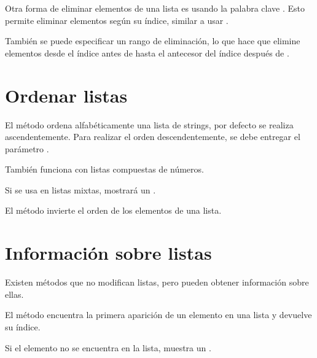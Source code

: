 Otra forma de eliminar elementos de una lista es usando la palabra clave .
Esto permite eliminar elementos según su índice, similar a usar .


También se puede especificar un rango de eliminación, lo que hace que elimine elementos desde el índice antes de \ttt{:} hasta el antecesor del índice después de \ttt{:}.


\section{Ordenar listas}

El método  ordena alfabéticamente una lista de strings, por defecto se realiza ascendentemente.
Para realizar el orden descendentemente, se debe entregar el parámetro .
  
  
También funciona con listas compuestas de números.


Si se usa en listas mixtas, mostrará un .


El método  invierte el orden de los elementos de una lista.
  

\section{Información sobre listas}

Existen métodos que no modifican listas, pero pueden obtener información sobre ellas.

El método  encuentra la primera aparición de un elemento en una lista y devuelve su índice.
  

Si el elemento no se encuentra en la lista, muestra un .

